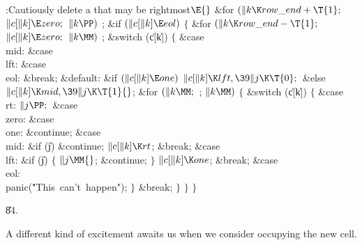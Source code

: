 \B{}:Cautiously delete a  that may be rightmost\X${}\E{}$\6
\&{for} ${}(\|k\K\\{row\_end}+\T{1};{}$ ${}\|c[\|k]\E\\{zero};{}$ ${}\|k\PP){}$%
\1\5
;\2\6
\&{if} ${}(\|c[\|k]\E\\{eol}){}$\5
${}\{{}$\1\6
\&{for} ${}(\|k\K\\{row\_end}-\T{1};{}$ ${}\|c[\|k]\E\\{zero};{}$ ${}\|k\MM){}$%
\1\5
;\2\6
\&{switch} (\|c[\|k])\5
${}\{{}$\1\6
\4\&{case} \\{mid}:\5
\&{case} \\{lft}:\5
\&{case} \\{eol}:\5
\&{break};\6
\4\&{default}:\5
\&{if} ${}(\|c[\|k]\E\\{one}){}$\1\5
${}\|c[\|k]\K\\{lft},\39\|j\K\T{0};{}$\2\6
\&{else}\1\5
${}\|c[\|k]\K\\{mid},\39\|j\K\T{1}{}$;\2\6
\&{for} ${}(\|k\MM;{}$  ; ${}\|k\MM){}$\5
${}\{{}$\1\6
\&{switch} (\|c[\|k])\5
${}\{{}$\1\6
\4\&{case} \\{rt}:\5
${}\|j\PP;{}$\6
\4\&{case} \\{zero}:\5
\&{case} \\{one}:\5
\&{continue};\6
\4\&{case} \\{mid}:\5
\&{if} (\|j)\1\5
\&{continue};\2\6
${}\|c[\|k]\K\\{rt}{}$;\5
\&{break};\6
\4\&{case} \\{lft}:\5
\&{if} (\|j)\5
${}\{{}$\5
\1${}\|j\MM{}$;\5
\&{continue};\5
${}\}{}$\2\6
${}\|c[\|k]\K\\{one}{}$;\5
\&{break};\6
\4\&{case} \\{eol}:\5
\\{panic}(\.{"This\ can't\ happen"});\6
\4${}\}{}$\2\6
\&{break};\6
\4${}\}{}$\2\6
\4${}\}{}$\2\6
\4${}\}{}$\2\par
\U84.\fi

A different kind of excitement awaits us when we consider
occupying the new cell.

